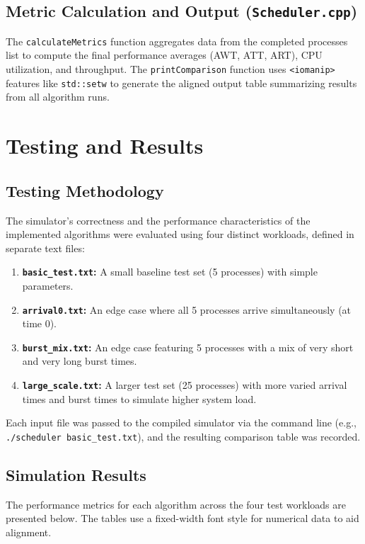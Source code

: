 \documentclass[12pt]{article}
\begin{document}
\subsection{Metric Calculation and Output (\texttt{Scheduler.cpp})}
The \texttt{calculateMetrics} function aggregates data from the completed processes list to compute the final performance averages (AWT, ATT, ART), CPU utilization, and throughput. The \texttt{printComparison} function uses \texttt{<iomanip>} features like \texttt{std::setw} to generate the aligned output table summarizing results from all algorithm runs.

\section{Testing and Results}
\subsection{Testing Methodology}
The simulator's correctness and the performance characteristics of the implemented algorithms were evaluated using four distinct workloads, defined in separate text files:
\begin{enumerate}[label=\arabic*)]
    \item \textbf{\texttt{basic\_test.txt}:} A small baseline test set (5 processes) with simple parameters.
    \item \textbf{\texttt{arrival0.txt}:} An edge case where all 5 processes arrive simultaneously (at time 0).
    \item \textbf{\texttt{burst\_mix.txt}:} An edge case featuring 5 processes with a mix of very short and very long burst times.
    \item \textbf{\texttt{large\_scale.txt}:} A larger test set (25 processes) with more varied arrival times and burst times to simulate higher system load.
\end{enumerate}
Each input file was passed to the compiled simulator via the command line (e.g., \texttt{./scheduler basic\_test.txt}), and the resulting comparison table was recorded.

\subsection{Simulation Results}
The performance metrics for each algorithm across the four test workloads are presented below. The tables use a fixed-width font style for numerical data to aid alignment.
\end{document}
